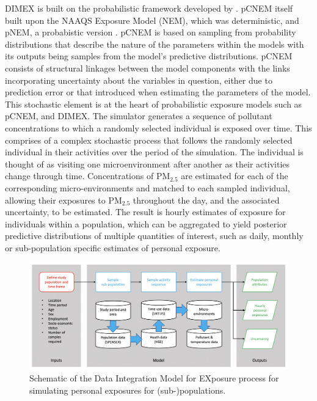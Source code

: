 \documentclass{article}
\begin{document}
 DIMEX is built on the probabilistic framework developed by \citep{zidek2003computational,zidek2005using, zidek2007framework}. pCNEM itself built upon the NAAQS Exposure Model (NEM), which was deterministic, and pNEM, a probabistic version \citep{johnson1992estimation}. pCNEM is based on sampling from probability distributions that describe the nature of the parameters within the models with its outputs being samples from the model's predictive distributions. pCNEM consists of structural linkages between the model components with the links incorporating uncertainty about the variables in question, either due to prediction error or that introduced when estimating the parameters of the model. This stochastic element is at the heart of probabilistic exposure models such as pCNEM, and DIMEX. The  simulator  generates a sequence of pollutant concentrations to which a randomly selected individual is exposed over time. This comprises of a  complex stochastic process that follows the randomly selected individual in their activities over the period of the simulation. The individual is thought of as visiting one microenvironment after another as their activities change through time. Concentrations of PM$_{2.5}$ are estimated for each of the corresponding micro-environments and matched to each sampled individual,  allowing their exposures to PM$_{2.5}$ throughout the day, and the associated uncertainty, to be estimated.  The result is hourly estimates of exposure for individuals within a population, which can be aggregated to yield posterior predictive distributions of multiple quantities of interest, such as daily, monthly or sub-population specific estimates of personal exposure. \\

\begin{figure}[!hbtp]
    \centering
    \includegraphics[width = 1.0\linewidth]{Figures/FlowChart3.png}
    \caption{Schematic of the Data Integration Model for EXposure process for simulating personal exposures for (sub-)populations.}
    \label{fig::schematic}
\end{figure}
\end{document}
